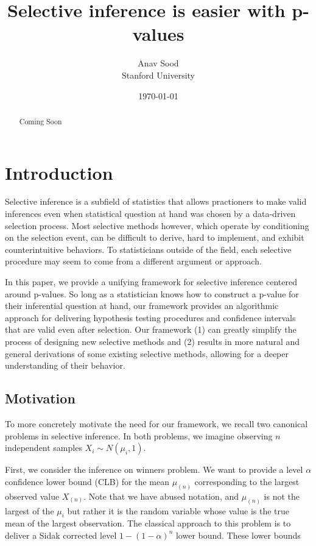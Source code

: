 \documentclass{article}
\title{Selective inference is easier with p-values}
\author{Anav Sood\\ Stanford University}
\date{\today}
\begin{document}
\maketitle

\begin{abstract}
Coming Soon
\end{abstract}


\section{Introduction}

Selective inference is a subfield of statistics that allows practioners to make valid inferences even when statistical question at hand was chosen by a data-driven selection process. Most selective methods however, which operate by conditioning on the selection event, can be difficult to derive, hard to implement, and exhibit counterintuitive behaviors. To statisticians outside of the field, each selective procedure may seem to come from a different argument or approach.


In this paper, we provide a unifying framework for selective inference centered around p-values. So long as a statistician knows how to construct a p-value for their inferential question at hand, our framework provides an algorithmic approach for delivering hypothesis testing procedures and confidence intervals that are valid even after selection. Our framework (1) can greatly simplify the process of designing new selective methods and (2) results in more natural and general derivations of some existing selective methods, allowing for a deeper understanding of their behavior.


\subsection{Motivation}

To more concretely motivate the need for our framework, we recall two canonical problems in selective inference. In both problems, we imagine observing $n$ independent samples $X_i \sim N(\mu_i, 1)$.

First, we consider the inference on winners problem. We want to provide a level $\alpha$ confidence lower bound (CLB) for the mean $\mu_{(n)}$ corresponding to the largest observed value $X_{(n)}$. Note that we have abused notation, and $\mu_{(n)}$ is not the largest of the $\mu_i$ but rather it is the random variable whose value is the true mean of the largest observation. The classical approach to this problem is to deliver a Sidak corrected level $1-(1-\alpha)^n$ lower bound. These lower bounds 
\end{document}
